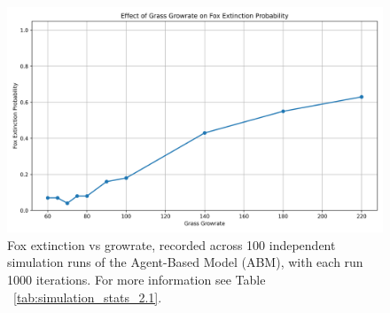 \begin{figure}[!ht]
  \centering
  \includegraphics[width=0.9\linewidth]{images/fox_extinction_vs_growrate_100.png}
  \caption{
    Fox extinction vs growrate, recorded across 100 independent simulation runs of the Agent-Based Model (ABM), with each run 1000 iterations. For more information see Table ~\ref{tab:simulation_stats_2.1}.
}
  \label{fig:fox_extinction_vs_growrate_100_2.1}
\end{figure}